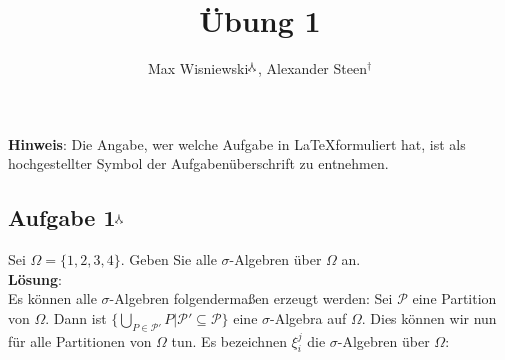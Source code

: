 \documentclass[11pt,a4paper,ngerman]{article}
\date{}
\title{Übung 1}
\author{Max Wisniewski$^\curlywedgedownarrow$, Alexander Steen$^\dagger$}
\newcommand{\set}[1]{ \{ #1 \}}
\begin{document}

\renewcommand{\figurename}{Figure}

\maketitle
\thispagestyle{fancy}

\begin{center}
\textbf{Hinweis}: Die Angabe, wer welche Aufgabe in \LaTeX formuliert hat, ist als hochgestellter Symbol der Aufgabenüberschrift zu entnehmen.
\end{center}


\subsection*{Aufgabe 1$^\curlywedgedownarrow$}
Sei $\Omega = \{1,2,3,4\}$. Geben Sie alle $\sigma$-Algebren über $\Omega$ an. \\

\textbf{Lösung}: \\
Es können alle $\sigma$-Algebren folgendermaßen erzeugt werden: Sei $ \mathcal{P}$ eine Partition von $\Omega$. Dann ist $\set{\bigcup_{P \in  \mathcal{P}'} P|  \mathcal{P}' \subseteq  \mathcal{P}}$ eine $\sigma$-Algebra auf $\Omega$. Dies können wir nun für alle Partitionen von $\Omega$ tun. Es bezeichnen $\xi^j_i$ die $\sigma$-Algebren über $\Omega$: \\
\end{document}
